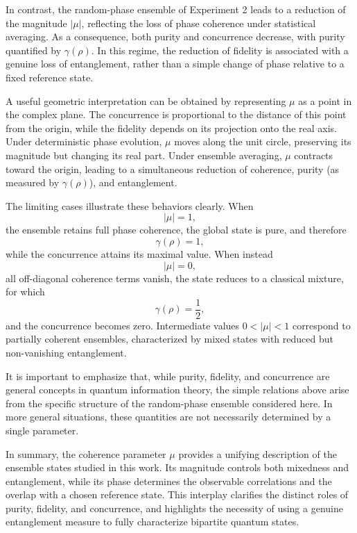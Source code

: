 \documentclass[a4paper]{article}
\begin{document}
\medskip

In contrast, the random-phase ensemble of Experiment 2 leads to a reduction of the magnitude \( |\mu| \), reflecting the loss of phase coherence under statistical averaging. As a consequence, both purity and concurrence decrease, with purity quantified by \(\gamma(\rho)\). In this regime, the reduction of fidelity is associated with a genuine loss of entanglement, rather than a simple change of phase relative to a fixed reference state.

\medskip

A useful geometric interpretation can be obtained by representing \(\mu\) as a point in the complex plane. The concurrence is proportional to the distance of this point from the origin, while the fidelity depends on its projection onto the real axis. Under deterministic phase evolution, \(\mu\) moves along the unit circle, preserving its magnitude but changing its real part. Under ensemble averaging, \(\mu\) contracts toward the origin, leading to a simultaneous reduction of coherence, purity (as measured by \(\gamma(\rho)\)), and entanglement.

\medskip

The limiting cases illustrate these behaviors clearly. When
\[
|\mu| = 1,
\]
the ensemble retains full phase coherence, the global state is pure, and therefore
\[
\gamma(\rho) = 1,
\]
while the concurrence attains its maximal value. When instead
\[
|\mu| = 0,
\]
all off-diagonal coherence terms vanish, the state reduces to a classical mixture, for which
\[
\gamma(\rho) = \frac{1}{2},
\]
and the concurrence becomes zero. Intermediate values \(0 < |\mu| < 1\) correspond to partially coherent ensembles, characterized by mixed states with reduced but non-vanishing entanglement.

\medskip

It is important to emphasize that, while purity, fidelity, and concurrence are general concepts in quantum information theory, the simple relations above arise from the specific structure of the random-phase ensemble considered here. In more general situations, these quantities are not necessarily determined by a single parameter.

\medskip

In summary, the coherence parameter \(\mu\) provides a unifying description of the ensemble states studied in this work. Its magnitude controls both mixedness and entanglement, while its phase determines the observable correlations and the overlap with a chosen reference state. This interplay clarifies the distinct roles of purity, fidelity, and concurrence, and highlights the necessity of using a genuine entanglement measure to fully characterize bipartite quantum states.
\end{document}
